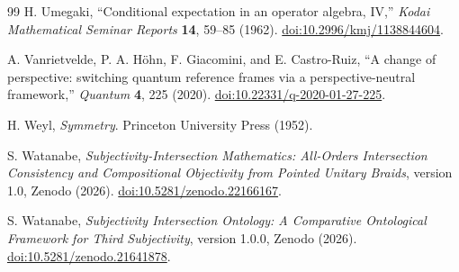 \documentclass[11pt]{article}
\theoremstyle{definition}
\theoremstyle{remark}
\begin{document}
\begin{thebibliography}{99}
H. Umegaki, ``Conditional expectation in an operator algebra, IV,'' \emph{Kodai Mathematical Seminar Reports} \textbf{14}, 59--85 (1962). \href{https://doi.org/10.2996/kmj/1138844604}{doi:10.2996/kmj/1138844604}.

A. Vanrietvelde, P. A. H\"ohn, F. Giacomini, and E. Castro-Ruiz, ``A change of perspective: switching quantum reference frames via a perspective-neutral framework,'' \emph{Quantum} \textbf{4}, 225 (2020). \href{https://doi.org/10.22331/q-2020-01-27-225}{doi:10.22331/q-2020-01-27-225}.

H. Weyl, \emph{Symmetry}. Princeton University Press (1952).

S. Watanabe, \emph{Subjectivity-Intersection Mathematics: All-Orders Intersection Consistency and Compositional Objectivity from Pointed Unitary Braids}, version 1.0, Zenodo (2026). \href{https://doi.org/10.5281/zenodo.22166167}{doi:10.5281/zenodo.22166167}.

S. Watanabe, \emph{Subjectivity Intersection Ontology: A Comparative Ontological Framework for Third Subjectivity}, version 1.0.0, Zenodo (2026). \href{https://doi.org/10.5281/zenodo.21641878}{doi:10.5281/zenodo.21641878}.

\end{thebibliography}
\end{document}
